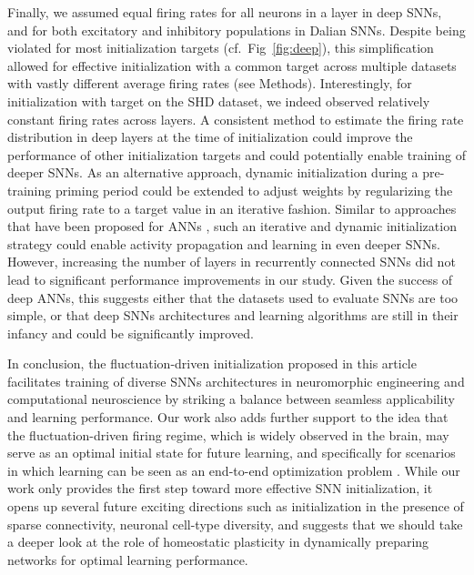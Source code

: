 \documentclass[11pt,a4paper]{article}
\begin{document}
Finally, we assumed equal firing rates  for all neurons in a layer in deep \acp{SNN}, and for both excitatory and inhibitory populations in Dalian \acp{SNN}.
Despite being violated for most initialization targets (cf.\ Fig~\ref{fig:deep}), this simplification allowed for effective initialization with a common target  across multiple datasets with vastly different average firing rates (see Methods).
Interestingly, for initialization with target  on the SHD dataset, we indeed observed relatively constant firing rates across layers.
A consistent method to estimate the firing rate distribution in deep layers at the time of initialization could improve the performance of other initialization targets and could potentially enable training of deeper \acp{SNN}.
As an alternative approach, dynamic initialization during a pre-training priming period could be extended to adjust weights by regularizing the output firing rate to a target value in an iterative fashion.
Similar to approaches that have been proposed for \acp{ANN} \citep{Mishkin2015-zd}, such an iterative and dynamic initialization strategy could enable activity propagation and learning in even deeper \acp{SNN}.
However, increasing the number of layers in recurrently connected \acp{SNN} did not lead to significant performance improvements in our study. 
Given the success of deep \acp{ANN}, this suggests either that the datasets used to evaluate \acp{SNN} are too simple, or that deep \acp{SNN} architectures and learning algorithms are still in their infancy and could be significantly improved.

\medskip

In conclusion, the fluctuation-driven initialization proposed in this article 
facilitates training of diverse \acp{SNN} architectures in neuromorphic engineering and computational neuroscience by striking a balance between seamless applicability and learning performance.
Our work also adds further support to the idea that the fluctuation-driven firing regime, which is widely observed in the brain, may serve as an optimal initial state for future learning, and specifically for scenarios in which learning can be seen as an end-to-end optimization problem \citep{marblestone_toward_2016, richards_deep_2019, lillicrap_backpropagation_2020}. 
While our work only provides the first step toward more effective \ac{SNN} initialization, it opens up several future exciting directions such as initialization in the presence of sparse connectivity, neuronal cell-type diversity, and suggests that we should take a deeper look at the role of homeostatic plasticity in dynamically preparing networks for optimal learning performance.
\end{document}
